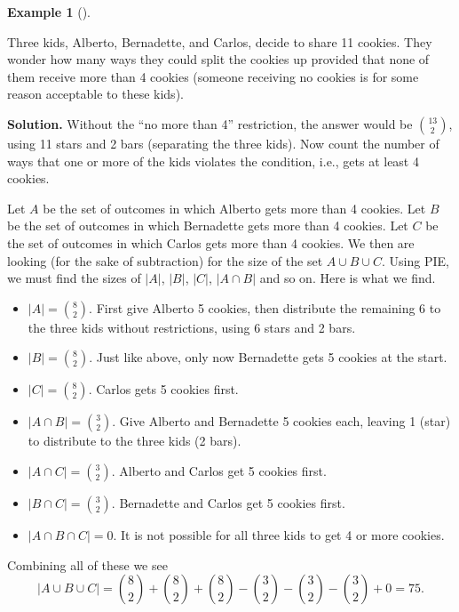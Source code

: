 \documentclass[10pt,]{book}
\theoremstyle{plain}
\theoremstyle{definition}
\newtheorem{example}[theorem]{Example}
\theoremstyle{definition}
\theoremstyle{definition}
\numberwithin{equation}{chapter}
\begin{document}
\begin{example}[]\label{example-46}

          Three kids, Alberto, Bernadette, and Carlos, decide to share 11 cookies. They wonder how many ways they could split the cookies up provided that none of them receive more than 4 cookies (someone receiving no cookies is for some reason acceptable to these kids).
\par\medskip\noindent%
\textbf{Solution.}\quad
          Without the ``no more than 4'' restriction, the answer would be \({13 \choose 2}\), using 11 stars and 2 bars (separating the three kids). Now count the number of ways that one or more of the kids violates the condition, i.e., gets at least 4 cookies.
\par

          Let \(A\) be the set of outcomes in which Alberto gets more than 4 cookies. Let \(B\) be the set of outcomes in which Bernadette gets more than 4 cookies. Let \(C\) be the set of outcomes in which Carlos gets more than 4 cookies. We then are looking (for the sake of subtraction) for the size of the set \(A \cup B \cup C\). Using PIE, we must find the sizes of \(|A|\), \(|B|\), \(|C|\), \(|A\cap B|\) and so on. Here is what we find.
\leavevmode%
\begin{itemize}[label=\textbullet]
\item{}\(|A| = {8 \choose 2}\). First give Alberto 5 cookies, then distribute the remaining 6 to the three kids without restrictions, using 6 stars and 2 bars.%
\item{}\(|B| = {8 \choose 2}\). Just like above, only now Bernadette gets 5 cookies at the start.%
\item{}\(|C| = {8 \choose 2}\). Carlos gets 5 cookies first.%
\item{}\(|A \cap B| = {3 \choose 2}\). Give Alberto and Bernadette 5 cookies each, leaving 1 (star) to distribute to the three kids (2 bars).%
\item{}\(|A \cap C| = {3 \choose 2}\). Alberto and Carlos get 5 cookies first.%
\item{}\(|B \cap C| = {3 \choose 2}\). Bernadette and Carlos get 5 cookies first.%
\item{}\(|A \cap B \cap C| = 0\). It is not possible for all three kids to get 4 or more cookies.%
\end{itemize}
\par

          Combining all of these we see
          \begin{equation*}
            |A \cup B \cup C| = {8 \choose 2} + {8 \choose 2} + {8 \choose 2} - {3 \choose 2} - {3 \choose 2} - {3 \choose 2} + 0 = 75.
          \end{equation*}
\par


\end{example}
\end{document}

